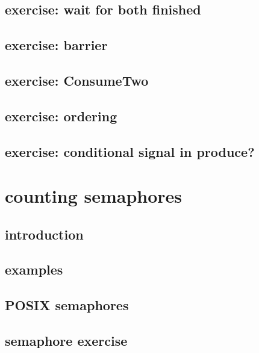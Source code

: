 \subsection{exercise: wait for both finished}


\subsection{exercise: barrier}


\subsection{exercise: ConsumeTwo}


\subsection{exercise: ordering}


\subsection{exercise: conditional signal in produce?}


\section{counting semaphores}

\subsection{introduction}



\subsection{examples}



\subsection{POSIX semaphores}



\subsection{semaphore exercise}


